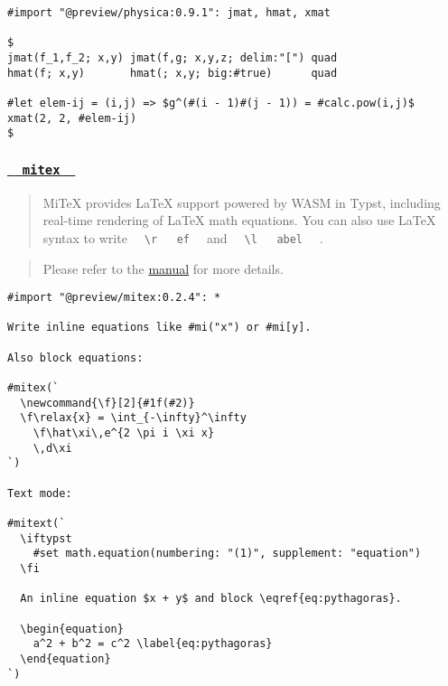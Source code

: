 \begin{verbatim}
#import "@preview/physica:0.9.1": jmat, hmat, xmat

$
jmat(f_1,f_2; x,y) jmat(f,g; x,y,z; delim:"[") quad
hmat(f; x,y)       hmat(; x,y; big:#true)      quad

#let elem-ij = (i,j) => $g^(#(i - 1)#(j - 1)) = #calc.pow(i,j)$
xmat(2, 2, #elem-ij)
$
\end{verbatim}

\pandocbounded{}

\subsubsection{\texorpdfstring{\hyperref[mitex]{\texttt{\ }{\texttt{\ mitex\ }}\texttt{\ }}}{  mitex  }}\label{mitex}

\begin{quote}
MiTeX provides LaTeX support powered by WASM in Typst, including
real-time rendering of LaTeX math equations. You can also use LaTeX
syntax to write
\texttt{\ }{\texttt{\ \textbackslash{}r\ }}\texttt{\ }{\texttt{\ ef\ }}\texttt{\ }
and
\texttt{\ }{\texttt{\ \textbackslash{}l\ }}\texttt{\ }{\texttt{\ abel\ }}\texttt{\ }
.
\end{quote}

\begin{quote}
Please refer to the \href{https://github.com/mitex-rs/mitex}{manual} for
more details.
\end{quote}

\begin{verbatim}
#import "@preview/mitex:0.2.4": *

Write inline equations like #mi("x") or #mi[y].

Also block equations:

#mitex(`
  \newcommand{\f}[2]{#1f(#2)}
  \f\relax{x} = \int_{-\infty}^\infty
    \f\hat\xi\,e^{2 \pi i \xi x}
    \,d\xi
`)

Text mode:

#mitext(`
  \iftypst
    #set math.equation(numbering: "(1)", supplement: "equation")
  \fi

  An inline equation $x + y$ and block \eqref{eq:pythagoras}.

  \begin{equation}
    a^2 + b^2 = c^2 \label{eq:pythagoras}
  \end{equation}
`)
\end{verbatim}


